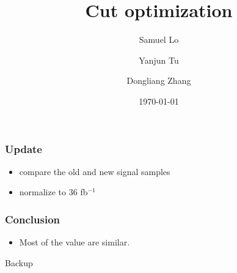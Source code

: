\documentclass[mathserif,serif]{beamer}
\title{Cut optimization}
\author
{
Samuel Lo \inst{1}
\and
Yanjun Tu  \inst{1}
\and
Dongliang Zhang  \inst{2}
}
\institute
{
\inst{1}
The University of Hong Kong
\and
\inst{2}
University of Michigan
}
\date{\today}
\begin{document}
\frame{\titlepage}

\begin{frame}
\frametitle{Update}
\begin{itemize}
\small
\item compare the old and new signal samples
\item normalize to 36 fb$^{-1}$
\end{itemize}
\end{frame}




\def \PathToPlot {../plot_signal}




%

\begin{frame}
\frametitle{Conclusion}
\begin{itemize}
\item Most of the value are similar.
\end{itemize}
\end{frame}


\begin{frame}
\begin{center}
\huge
Backup
\end{center}
\end{frame}
\end{document}
